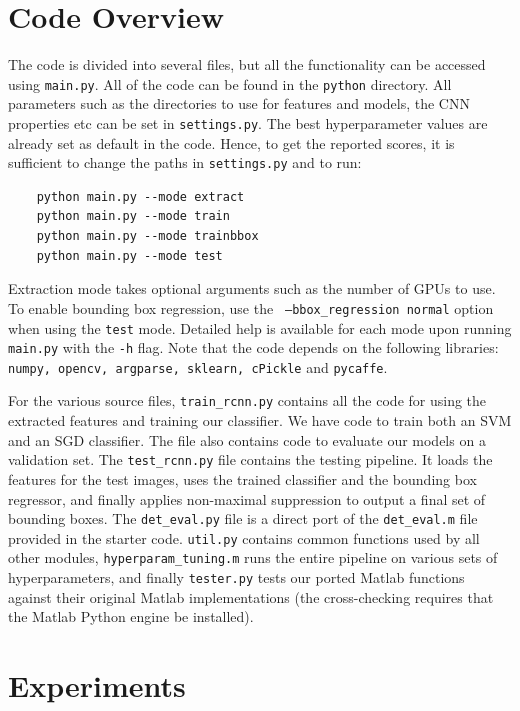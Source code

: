 \documentclass[10pt,twocolumn,letterpaper]{article}
\begin{document}
\section{Code Overview}
The code is divided into several files, but all the functionality can be accessed using \texttt{main.py}. All of the code can be found in the \texttt{python} directory. All parameters such as the directories to use for features and models, the CNN properties etc can be set in \texttt{settings.py}. The best hyperparameter values are already set as default in the code. Hence, to get the reported scores, it is sufficient to change the paths in \texttt{settings.py} and to run:
\begin{verbatim}
    python main.py --mode extract
    python main.py --mode train
    python main.py --mode trainbbox
    python main.py --mode test
\end{verbatim}
Extraction mode takes optional arguments such as the number of GPUs to use. To enable bounding box regression, use the \texttt{ --bbox\_regression normal} option when using the \texttt{test} mode. Detailed help is available for each mode upon running \texttt{main.py} with the \texttt{-h} flag. Note that the code depends on the following libraries: \texttt{numpy, opencv, argparse, sklearn, cPickle} and \texttt{pycaffe}. 

For the various source files, \texttt{train\_rcnn.py} contains all the code for using the extracted features and training our classifier. We have code to train both an SVM and an SGD classifier. The file also contains code to evaluate our models on a validation set. The \texttt{test\_rcnn.py} file contains the testing pipeline. It loads the features for the test images, uses the trained classifier and the bounding box regressor, and finally applies non-maximal suppression to output a final set of bounding boxes. The \texttt{det\_eval.py} file is a direct port of the \texttt{det\_eval.m} file provided in the starter code. \texttt{util.py} contains common functions used by all other modules, \texttt{hyperparam\_tuning.m} runs the entire pipeline on various sets of hyperparameters, and finally \texttt{tester.py} tests our ported Matlab functions against their original Matlab implementations (the cross-checking requires that the Matlab Python engine be installed).

\section{Experiments}\label{sec:experiments}
\end{document}

